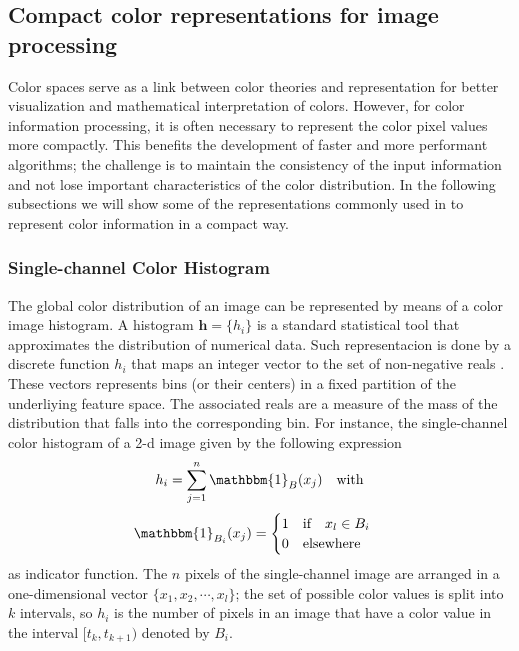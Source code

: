 \subsection{Compact color representations for image processing}

Color spaces serve as a link between color theories and representation for better visualization and mathematical interpretation of colors. However, for color information processing, it is often necessary to represent the color pixel values more compactly. This benefits the development of faster and more performant algorithms; the challenge is to maintain the consistency of the input information and not lose important characteristics of the color distribution. In the following subsections we will show some of the representations commonly used in to represent color information in a compact way.


\subsubsection{Single-channel Color Histogram}
The global color distribution of an image can be represented by means of a color image histogram.  A histogram $\mathbf{h}= \{h_i\}$ is a standard statistical tool that approximates the distribution of numerical data. Such representacion is done by a discrete function $h_i$ that maps an integer vector to the set of non-negative reals \citep{Scott:Book:2008}. These vectors represents bins (or their centers) in a fixed partition of the underliying feature space. The associated reals are a measure of the mass of the distribution that falls into the corresponding bin. For instance, the single-channel color histogram of a 2-d image 
given by the following expression
\begin{equation}\label{eq:single_channel_histogram}
    h_i = \sum_{j=1}^{n}  \mathbbm{1}_{B}(x_j) \quad \textrm{with} 
\end{equation}
\begin{equation}\nonumber
    \mathbbm{1}_{B_i}(x_j) = 
    \begin{cases} 
      1 \quad \textrm{if} \quad x_l \in B_i \\
      0 \quad \textrm{elsewhere}        
   	 \end{cases} 
\end{equation}
as indicator function. The $n$ pixels of the single-channel image are arranged in a one-dimensional vector $\{x_1, x_2, \cdots, x_l\}$; the set of possible color values is split into $k$ intervals, so $h_i$ is the number of pixels in an image that have a color value in the interval $[t_k, t_{k+1})$ denoted by $B_i$.

